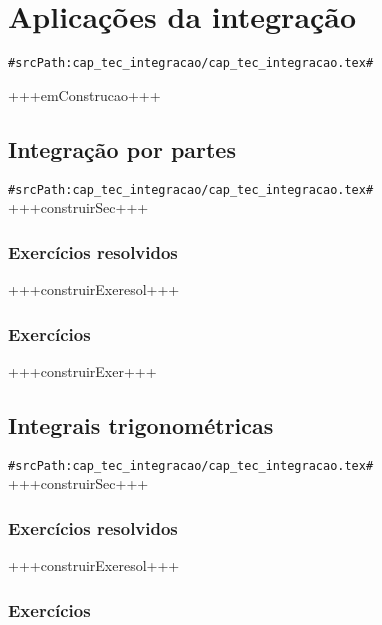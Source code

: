 
\chapter{Aplicações da integração}
\verb+#srcPath:cap_tec_integracao/cap_tec_integracao.tex#+
\label{cap:apl_integracao}

+++emConstrucao+++

\section{Integração por partes}
\verb+#srcPath:cap_tec_integracao/cap_tec_integracao.tex#+
+++construirSec+++


\subsection*{Exercícios resolvidos}

+++construirExeresol+++


\subsection*{Exercícios}

+++construirExer+++


\section{Integrais trigonométricas}
\verb+#srcPath:cap_tec_integracao/cap_tec_integracao.tex#+
+++construirSec+++

\subsection*{Exercícios resolvidos}

+++construirExeresol+++


\subsection*{Exercícios}


